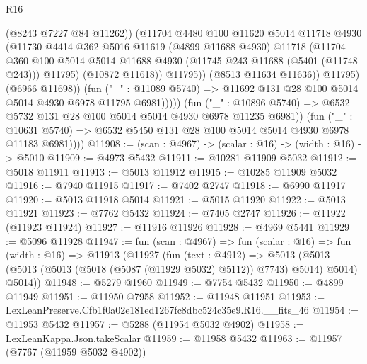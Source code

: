 \begin{lexlean}{R16}
\begin{coremodule}
                              (@8243 @7227 @84 @11262))
                            (@11704
                              @4480
                              @100
                              @11620
                              @5014
                              @11718
                              @4930
                              (@11730
                                @4414
                                @362
                                @5016
                                @11619
                                (@4899 @11688 @4930)
                                @11718
                                (@11704
                                  @360
                                  @100
                                  @5014
                                  @5014
                                  @11688
                                  @4930
                                  (@11745 @243 @11688 (@5401 (@11748 @243)))
                                  @11795)
                                (@10872 @11618))
                              @11795))
                          (@8513 @11634 @11636))
                        @11795)
                      (@6966 @11698))
                    (fun ("_" : @11089 @5740) =>
                    @11692 @131 @28 @100 @5014 @5014 @4930 @6978 @11795 @6981)))))
            (fun ("_" : @10896 @5740) =>
            @6532 @5732 @131 @28 @100 @5014 @5014 @4930 @6978 @11235 @6981))
          (fun ("_" : @10631 @5740) =>
          @6532 @5450 @131 @28 @100 @5014 @5014 @4930 @6978 @11183 @6981))))
@11908 := (scan : @4967) -> (scalar : @16) -> (width : @16) -> @5010
@11909 := @4973 @5432
@11911 := @10281 @11909 @5032
@11912 := @5018 @11911
@11913 := @5013 @11912
@11915 := @10285 @11909 @5032
@11916 := @7940 @11915
@11917 := @7402 @2747
@11918 := @6990 @11917
@11920 := @5013 @11918 @5014
@11921 := @5015 @11920
@11922 := @5013 @11921
@11923 := @7762 @5432
@11924 := @7405 @2747
@11926 := @11922 (@11923 @11924)
@11927 := @11916 @11926
@11928 := @4969 @5441
@11929 := @5096 @11928
@11947 := fun (scan : @4967) =>
  fun (scalar : @16) =>
  fun (width : @16) =>
  @11913
    (@11927
      (fun (text : @4912) =>
      @5013 (@5013 (@5013 (@5013 (@5018 (@5087 (@11929 @5032) @5112)) @7743) @5014) @5014) @5014))
@11948 := @5279 @1960
@11949 := @7754 @5432
@11950 := @4899 @11949
@11951 := @11950 @7958
@11952 := @11948 @11951
@11953 := LexLeanPreserve.Cfb1f0a02e181ed1267fc8dbc524c35e9.R16.__fits_46
@11954 := @11953 @5432
@11957 := @5288 (@11954 @5032 @4902)
@11958 := LexLeanKappa.Json.takeScalar
@11959 := @11958 @5432
@11963 := @11957 (@7767 (@11959 @5032 @4902))

\end{coremodule}
\end{lexlean}
